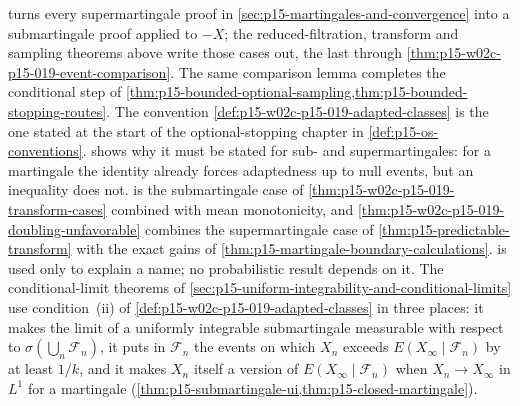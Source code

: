  turns every supermartingale
proof in \cref{sec:p15-martingales-and-convergence} into a
submartingale proof applied to \(-X\); the reduced-filtration, transform
and sampling theorems above write those cases out, the last through
\cref{thm:p15-w02c-p15-019-event-comparison}. The same comparison lemma
completes the conditional step of
\cref{thm:p15-bounded-optional-sampling,thm:p15-bounded-stopping-routes}.
The convention \cref{def:p15-w02c-p15-019-adapted-classes} is the one
stated at the start of the optional-stopping chapter in
\cref{def:p15-os-conventions}.
 shows why it must be
stated for sub- and supermartingales: for a martingale the identity
already forces adaptedness up to null events, but an inequality does
not.
 is the submartingale case of
\cref{thm:p15-w02c-p15-019-transform-cases} combined with mean
monotonicity, and \cref{thm:p15-w02c-p15-019-doubling-unfavorable}
combines the supermartingale case of \cref{thm:p15-predictable-transform}
with the exact gains of \cref{thm:p15-martingale-boundary-calculations}.
 is used only to explain a name;
no probabilistic result depends on it.
The conditional-limit theorems of
\cref{sec:p15-uniform-integrability-and-conditional-limits} use
condition~(ii) of \cref{def:p15-w02c-p15-019-adapted-classes} in three
places: it makes the limit of a uniformly integrable submartingale
measurable with respect to \(\sigma(\bigcup_n\mathcal F_n)\), it puts in
\(\mathcal F_n\) the events on which \(X_n\) exceeds
\(E(X_\infty\mid\mathcal F_n)\) by at least \(1/k\), and it makes \(X_n\)
itself a version of \(E(X_\infty\mid\mathcal F_n)\) when \(X_n\to X_\infty\)
in \(L^1\) for a martingale
(\cref{thm:p15-submartingale-ui,thm:p15-closed-martingale}).
